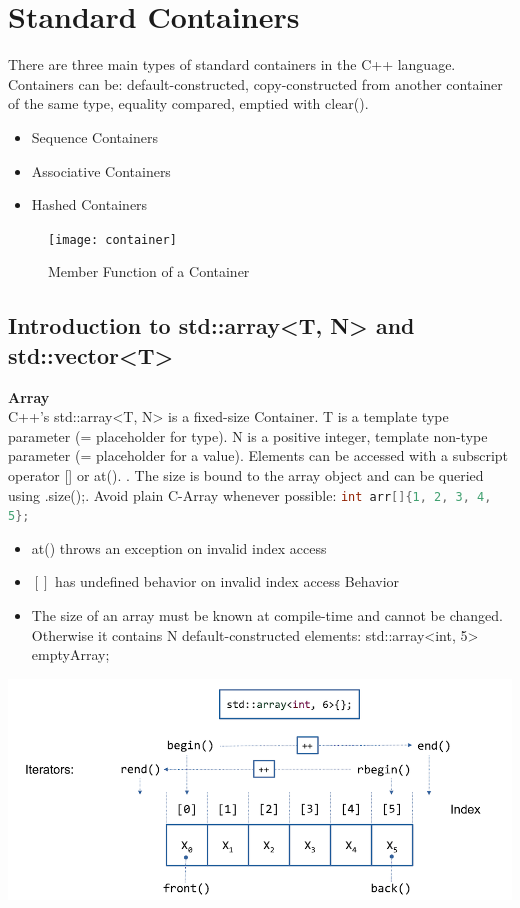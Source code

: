 \section{Standard Containers}
There are three main types of standard containers in the C++ language. \\ Containers can be: default-constructed, copy-constructed from another container of the same type, equality compared, emptied with clear().
\begin{itemize}
	\itemsep -0.5em
	\item Sequence Containers
	\item Associative Containers
	\item Hashed Containers
\end{itemize}

\begin{figure}[h!]
  \centering
  \texttt{[image: container]}
  \caption{Member Function of a Container}
\end{figure}

\subsection{Introduction to std::array<T, N> and std::vector<T>}
\textbf{Array}\\
C++'s std::array<T, N> is a fixed-size Container.  T is a template type parameter (= placeholder for type). N is a positive integer, template non-type parameter (= placeholder for a value). Elements can be accessed with a subscript operator [] or at(). . The size is bound to the array object and can be queried using .size();. Avoid plain C-Array whenever possible: \lstinline[language=C++]|int arr[]{1, 2, 3, 4, 5};|
\begin{itemize}
  \itemsep -0.5em 
  \item at() throws an exception on invalid index access
  \item $[]$ has undefined behavior on invalid index access Behavior
  \item The size of an array must be known at compile-time and cannot be changed. Otherwise it contains N default-constructed elements: std::array<int, 5> emptyArray{};
\end{itemize}
\begin{center}
\includegraphics[width=0.75\linewidth]{images/array}
\end{center}

